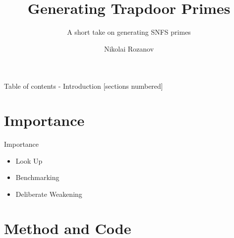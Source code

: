 \documentclass[10pt]{beamer}
\title{Generating Trapdoor Primes}
\subtitle{A short take on generating SNFS primes}
\date{}
\author{Nikolai Rozanov}
\institute{UCL - Computer Science}
\begin{document}
\maketitle

%
%
\begin{frame}{Table of contents - Introduction}
  [sections numbered]
  \tableofcontents[hideallsubsections]
\end{frame}



%
%
\section{Importance}
\begin{frame}[fragile]{Importance}

\begin{itemize}
\item Look Up
\item Benchmarking
\item Deliberate Weakening
\end{itemize}



\end{frame}

%
%
\section{Method and Code}
\end{document}
